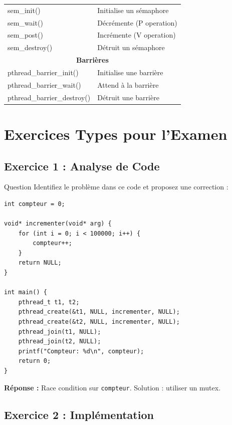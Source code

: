 \documentclass[11pt,a4paper]{article}
\begin{document}
\begin{center}
\begin{tabular}{|l|p{9cm}|}
\hline
sem\_init() & Initialise un sémaphore \\
sem\_wait() & Décrémente (P operation) \\
sem\_post() & Incrémente (V operation) \\
sem\_destroy() & Détruit un sémaphore \\
\hline
\multicolumn{2}{|c|}{\textbf{Barrières}} \\
\hline
pthread\_barrier\_init() & Initialise une barrière \\
pthread\_barrier\_wait() & Attend à la barrière \\
pthread\_barrier\_destroy() & Détruit une barrière \\
\hline
\end{tabular}
\end{center}

\section{Exercices Types pour l'Examen}

\subsection{Exercice 1 : Analyse de Code}

\begin{examplebox}{Question}
Identifiez le problème dans ce code et proposez une correction :
\end{examplebox}

\begin{lstlisting}
int compteur = 0;

void* incrementer(void* arg) {
    for (int i = 0; i < 100000; i++) {
        compteur++;
    }
    return NULL;
}

int main() {
    pthread_t t1, t2;
    pthread_create(&t1, NULL, incrementer, NULL);
    pthread_create(&t2, NULL, incrementer, NULL);
    pthread_join(t1, NULL);
    pthread_join(t2, NULL);
    printf("Compteur: %d\n", compteur);
    return 0;
}
\end{lstlisting}

\textbf{Réponse :} Race condition sur \texttt{compteur}. Solution : utiliser un mutex.

\subsection{Exercice 2 : Implémentation}
\end{document}
